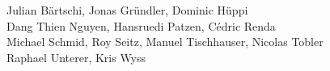 %
%
%
Julian Bärtschi,
Jonas Gründler,
Dominic Hüppi%
\\
Dang Thien Nguyen,
Hansruedi Patzen,
Cédric Renda%
\\
Michael Schmid,
Roy Seitz,
Manuel Tischhauser,
Nicolas Tobler%
\\
Raphael Unterer,
Kris Wyss
